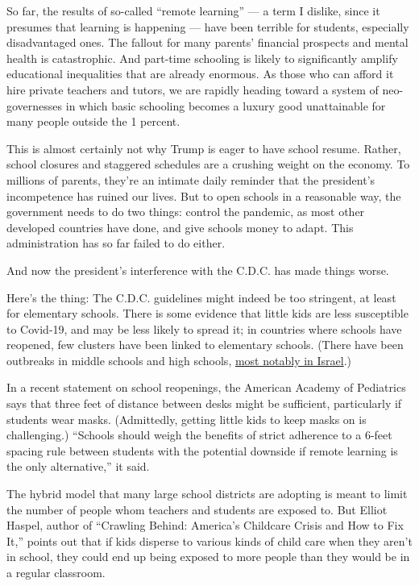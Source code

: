 So far, the results of so-called ``remote learning'' --- a term I
dislike, since it presumes that learning is happening --- have been
terrible for students, especially disadvantaged ones. The fallout for
many parents' financial prospects and mental health is catastrophic. And
part-time schooling is likely to significantly amplify educational
inequalities that are already enormous. As those who can afford it hire
private teachers and tutors, we are rapidly heading toward a system of
neo-governesses in which basic schooling becomes a luxury good
unattainable for many people outside the 1 percent.

This is almost certainly not why Trump is eager to have school resume.
Rather, school closures and staggered schedules are a crushing weight on
the economy. To millions of parents, they're an intimate daily reminder
that the president's incompetence has ruined our lives. But to open
schools in a reasonable way, the government needs to do two things:
control the pandemic, as most other developed countries have done, and
give schools money to adapt. This administration has so far failed to do
either.

And now the president's interference with the C.D.C. has made things
worse.

Here's the thing: The C.D.C. guidelines might indeed be too stringent,
at least for elementary schools. There is some evidence that little kids
are less susceptible to Covid-19, and may be less likely to spread it;
in countries where schools have reopened, few clusters have been linked
to elementary schools. (There have been outbreaks in middle schools and
high schools,
\href{https://www.wsj.com/articles/israel-shuts-some-schools-as-coronavirus-cases-jump-after-reopening-11591203323}{most
notably in Israel}.)

In a recent statement on school reopenings, the American Academy of
Pediatrics says that three feet of distance between desks might be
sufficient, particularly if students wear masks. (Admittedly, getting
little kids to keep masks on is challenging.) ``Schools should weigh the
benefits of strict adherence to a 6-feet spacing rule between students
with the potential downside if remote learning is the only
alternative,'' it said.

The hybrid model that many large school districts are adopting is meant
to limit the number of people whom teachers and students are exposed to.
But Elliot Haspel, author of ``Crawling Behind: America's Childcare
Crisis and How to Fix It,'' points out that if kids disperse to various
kinds of child care when they aren't in school, they could end up being
exposed to more people than they would be in a regular classroom.

